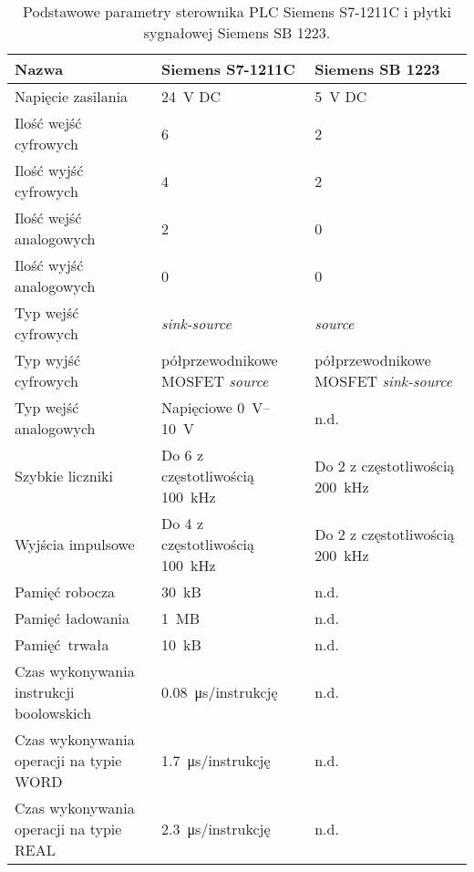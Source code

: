 \begin{table}[H]
    \centering
    \begin{threeparttable}
        \caption{Podstawowe parametry sterownika PLC Siemens S7-1211C i płytki sygnałowej Siemens SB 1223.}
        \label{tab:parametry_PLC_SB}
        
        \begin{tabularx}{\textwidth}{p{5cm} | p{5cm} | p{5cm} }
            \toprule
            Nazwa & Siemens S7-1211C & Siemens SB 1223 \\
            \midrule
            Napięcie zasilania & \SI{24}{V} DC & \SI{5}{V} DC \\
            \midrule
            Ilość wejść cyfrowych & 6 & 2 \\
            Ilość wyjść cyfrowych & 4 & 2 \\
            Ilość wejść analogowych & 2 & 0 \\
            Ilość wyjść analogowych & 0 & 0 \\
            Typ wejść cyfrowych & \textit{sink-source} & \textit{source} \\
            Typ wyjść cyfrowych & półprzewodnikowe MOSFET \textit{source} & półprzewodnikowe MOSFET \textit{sink-source} \\
            Typ wejść analogowych & Napięciowe \SIrange[range-units=single]{0}{10}{V} & n.d. \\
            \midrule
            Szybkie liczniki & Do 6 z częstotliwością \SI{100}{kHz}\tnote{b} & Do 2 z częstotliwością \SI{200}{kHz}\tnote{c} \\
            Wyjścia impulsowe & Do 4 z częstotliwością \SI{100}{kHz} & Do 2 z częstotliwością \SI{200}{kHz} \\
            \midrule
            Pamięć robocza & \SI{30}{kB} & n.d. \\
            Pamięć ładowania & \SI{1}{MB} & n.d. \\
            Pamięć trwała & \SI{10}{kB} & n.d. \\
            \midrule
            Czas wykonywania instrukcji boolowskich & \SI{0,08}{\micro\second}/instrukcję & n.d. \\
            Czas wykonywania operacji na typie WORD & \SI{1,7}{\micro\second}/instrukcję & n.d. \\
            Czas wykonywania operacji na typie REAL & \SI{2,3}{\micro\second}/instrukcję & n.d. \\
            \bottomrule
        \end{tabularx}
        

\end{threeparttable}
\end{table}
